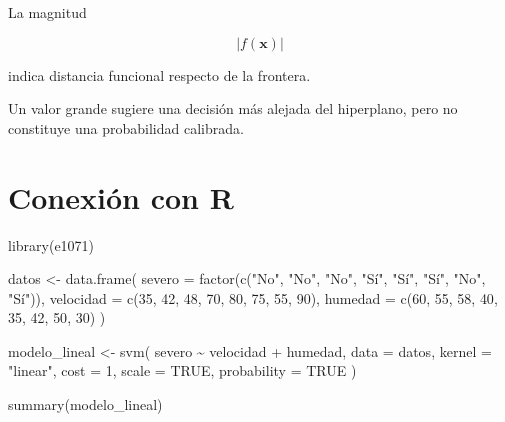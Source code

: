 \documentclass[
  spanish,
  10.5pt,
  letterpaper,
  DIV=11,
  numbers=noendperiod,
  oneside,
  open=any]{scrreprt}
\newenvironment{Shaded}{\begin{snugshade}}{\end{snugshade}}
\newcommand{\AttributeTok}[1]{\textcolor[rgb]{0.40,0.45,0.13}{#1}}
\newcommand{\ConstantTok}[1]{\textcolor[rgb]{0.56,0.35,0.01}{#1}}
\newcommand{\DecValTok}[1]{\textcolor[rgb]{0.68,0.00,0.00}{#1}}
\newcommand{\FunctionTok}[1]{\textcolor[rgb]{0.28,0.35,0.67}{#1}}
\newcommand{\NormalTok}[1]{\textcolor[rgb]{0.00,0.23,0.31}{#1}}
\newcommand{\OtherTok}[1]{\textcolor[rgb]{0.00,0.23,0.31}{#1}}
\newcommand{\SpecialCharTok}[1]{\textcolor[rgb]{0.37,0.37,0.37}{#1}}
\newcommand{\StringTok}[1]{\textcolor[rgb]{0.13,0.47,0.30}{#1}}
\theoremstyle{definition}
\theoremstyle{definition}
\theoremstyle{plain}
\theoremstyle{remark}
\begin{document}

La magnitud

\[
|f(\mathbf{x})|
\]

indica distancia funcional respecto de la frontera.

Un valor grande sugiere una decisión más alejada del hiperplano, pero no
constituye una probabilidad calibrada.

\section*{Conexión con R}\label{conexiuxf3n-con-r-13}


\begin{Shaded}
\begin{Highlighting}[numbers=left,,]
\FunctionTok{library}\NormalTok{(e1071)}

\NormalTok{datos }\OtherTok{\textless{}{-}} \FunctionTok{data.frame}\NormalTok{(}
  \AttributeTok{severo =} \FunctionTok{factor}\NormalTok{(}\FunctionTok{c}\NormalTok{(}\StringTok{"No"}\NormalTok{, }\StringTok{"No"}\NormalTok{, }\StringTok{"No"}\NormalTok{, }\StringTok{"Sí"}\NormalTok{, }\StringTok{"Sí"}\NormalTok{, }\StringTok{"Sí"}\NormalTok{, }\StringTok{"No"}\NormalTok{, }\StringTok{"Sí"}\NormalTok{)),}
  \AttributeTok{velocidad =} \FunctionTok{c}\NormalTok{(}\DecValTok{35}\NormalTok{, }\DecValTok{42}\NormalTok{, }\DecValTok{48}\NormalTok{, }\DecValTok{70}\NormalTok{, }\DecValTok{80}\NormalTok{, }\DecValTok{75}\NormalTok{, }\DecValTok{55}\NormalTok{, }\DecValTok{90}\NormalTok{),}
  \AttributeTok{humedad =} \FunctionTok{c}\NormalTok{(}\DecValTok{60}\NormalTok{, }\DecValTok{55}\NormalTok{, }\DecValTok{58}\NormalTok{, }\DecValTok{40}\NormalTok{, }\DecValTok{35}\NormalTok{, }\DecValTok{42}\NormalTok{, }\DecValTok{50}\NormalTok{, }\DecValTok{30}\NormalTok{)}
\NormalTok{)}

\NormalTok{modelo\_lineal }\OtherTok{\textless{}{-}} \FunctionTok{svm}\NormalTok{(}
\NormalTok{  severo }\SpecialCharTok{\textasciitilde{}}\NormalTok{ velocidad }\SpecialCharTok{+}\NormalTok{ humedad,}
  \AttributeTok{data =}\NormalTok{ datos,}
  \AttributeTok{kernel =} \StringTok{"linear"}\NormalTok{,}
  \AttributeTok{cost =} \DecValTok{1}\NormalTok{,}
  \AttributeTok{scale =} \ConstantTok{TRUE}\NormalTok{,}
  \AttributeTok{probability =} \ConstantTok{TRUE}
\NormalTok{)}

\FunctionTok{summary}\NormalTok{(modelo\_lineal)}


\end{Highlighting}
\end{Shaded}
\end{document}

